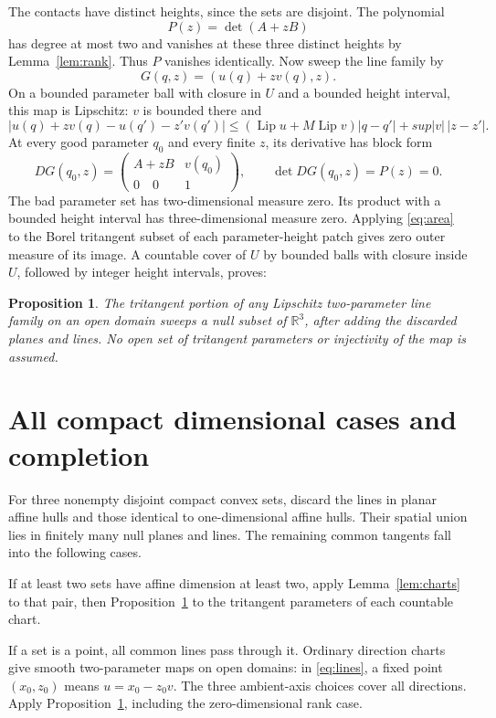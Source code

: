 \documentclass[11pt]{article}
\newcommand{\R}{\mathbb R}
\newtheorem{proposition}[theorem]{Proposition}
\theoremstyle{remark}
\begin{document}
The contacts have distinct heights, since the sets are disjoint. The polynomial
\[
P(z)=\det(A+zB)
\]
has degree at most two and vanishes at these three distinct heights by Lemma~\ref{lem:rank}. Thus $P$ vanishes identically. Now sweep the line family by
\[
G(q,z)=(u(q)+zv(q),z).
\]
On a bounded parameter ball with closure in $U$ and a bounded height interval, this map is Lipschitz: $v$ is bounded there and
\[
|u(q)+zv(q)-u(q')-z'v(q')|
\le (\operatorname{Lip}u+M\operatorname{Lip}v)|q-q'|+sup|v|\,|z-z'|.
\]
At every good parameter $q_0$ and every finite $z$, its derivative has block form
\[
DG(q_0,z)=\begin{pmatrix}A+zB&v(q_0)\\0\quad0&1\end{pmatrix},
\qquad\det DG(q_0,z)=P(z)=0.
\]
The bad parameter set has two-dimensional measure zero. Its product with a bounded height interval has three-dimensional measure zero. Applying \eqref{eq:area} to the Borel tritangent subset of each parameter-height patch gives zero outer measure of its image. A countable cover of $U$ by bounded balls with closure inside $U$, followed by integer height intervals, proves:
\begin{proposition}\label{prop:sweep}
The tritangent portion of any Lipschitz two-parameter line family on an open domain sweeps a null subset of $\R^3$, after adding the discarded planes and lines. No open set of tritangent parameters or injectivity of the map is assumed.
\end{proposition}

\section{All compact dimensional cases and completion}
For three nonempty disjoint compact convex sets, discard the lines in planar affine hulls and those identical to one-dimensional affine hulls. Their spatial union lies in finitely many null planes and lines. The remaining common tangents fall into the following cases.

If at least two sets have affine dimension at least two, apply Lemma~\ref{lem:charts} to that pair, then Proposition~\ref{prop:sweep} to the tritangent parameters of each countable chart.

If a set is a point, all common lines pass through it. Ordinary direction charts give smooth two-parameter maps on open domains: in \eqref{eq:lines}, a fixed point $(x_0,z_0)$ means $u=x_0-z_0v$. The three ambient-axis choices cover all directions. Apply Proposition~\ref{prop:sweep}, including the zero-dimensional rank case.
\end{document}
